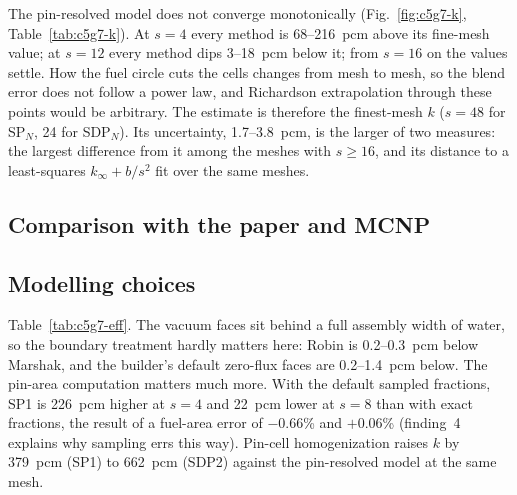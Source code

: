The pin-resolved model does not converge monotonically
(Fig.~\ref{fig:c5g7-k}, Table~\ref{tab:c5g7-k}). At $s = 4$ every method is
68--216~pcm above its fine-mesh value; at $s = 12$ every method dips 3--18~pcm
below it; from $s = 16$ on the values settle. How the fuel circle cuts the
cells changes from mesh to mesh, so the blend error does not follow a power
law, and Richardson extrapolation through these points would be arbitrary.
The estimate is therefore the finest-mesh $k$ ($s = 48$ for SP$_N$, 24 for
SDP$_N$). Its uncertainty, 1.7--3.8~pcm, is the larger of two measures: the
largest difference from it among the meshes with $s \ge 16$, and its
distance to a least-squares $k_\infty + b/s^2$ fit over the same meshes.

\begin{table}[h]
\caption{C5G7 pin-resolved eigenvalues, Marshak vacuum. Paper column: Table~7
$k$ and $10^5 (k - k_{\rm MCNP})$. Differences in pcm.}
\label{tab:c5g7-k}
\end{table}

\subsection{Comparison with the paper and MCNP}



\subsection{Modelling choices}

\begin{table}[h]
\caption{C5G7 at $s = 8$: effect of the vacuum treatment and of pin-cell
homogenization on $k$ (pcm).}
\label{tab:c5g7-eff}
\end{table}

Table~\ref{tab:c5g7-eff}. The vacuum faces sit behind a full assembly width
of water, so the boundary treatment hardly matters here: Robin is 0.2--0.3~pcm
below Marshak, and the builder's default zero-flux faces are 0.2--1.4~pcm
below. The pin-area computation matters much more. With the default sampled
fractions, SP1 is 226~pcm higher at $s = 4$ and 22~pcm lower at $s = 8$ than
with exact fractions, the result of a fuel-area error of $-0.66$\% and
$+0.06$\% (finding~4 explains why sampling errs this way). Pin-cell homogenization raises $k$ by 379~pcm (SP1) to 662~pcm
(SDP2) against the pin-resolved model at the same mesh.

